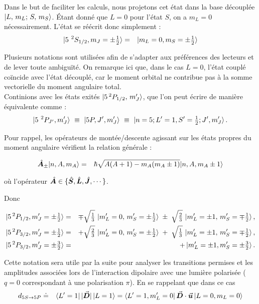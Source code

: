 Dans le but de faciliter les calculs, nous projetons cet état dans la base découplée $\ket{L,\,m_L;\,S,\,m_S}$. Étant donné que $L = 0$ pour l’état $S$, on a $m_L = 0$ nécessairement. L’état se réécrit donc simplement :
\begin{eqnarray*}
	\ket{ 5{~}^2S_{1/2} , m_J = \pm \tfrac12  } & = & \ket{  m_L = 0  , m_S= \pm \tfrac12  }  	
\end{eqnarray*}


Plusieurs notations sont utilisées afin de s’adapter aux préférences des lecteurs et de lever toute ambiguïté.
On remarque ici que, dans le cas $L = 0$, l’état couplé coïncide avec l’état découplé, car le moment orbital ne contribue pas à la somme vectorielle du moment angulaire total.\\

Continions avec les états exités $\ket{5\,^2P_{1/2},\,m_J'}$, que l’on peut écrire de manière équivalente comme :
\begin{eqnarray*}
	\ket{ 5{~}^2P_{J'} , m_J'  } ~\equiv~ \ket{ 5P , J'  , m_J' }  ~\equiv~ \ket{n=5 ; L'=1 , S'=\tfrac12 ;  J'  , m_J'  }.
\end{eqnarray*}

Pour rappel, les opérateurs de montée/descente agissant sur les états propres du moment angulaire vérifient la relation générale :


\begin{eqnarray}
	\hat{\bm{A}}_\pm \vert n , A , m	_A \rangle & = & \hbar \sqrt{A(A+1) - m_A(m_A\pm 1 ) } \vert n , A , m	_A \pm 1  \rangle
\end{eqnarray}

où l'opérateur $\hat{\bm{A}} \in \{ \hat{\bm{S}} , \hat{\bm{L}} , \hat{\bm{J}} , \cdots \}$.

Donc 

\begin{eqnarray*} 
	\ket{5\,^2P_{1/2},m_J' = \pm\tfrac12} &=& \mp\sqrt{\tfrac{1}{3}}\,\ket{ m_L'=0,\,m_S'=\pm\tfrac12} \;\pm\;\sqrt{\tfrac{2}{3}}\,\ket{m_L'=\pm 1,\,m_S'=\mp\tfrac12},\\ 
	\ket{5\,^2P_{3/2},m_J' = \pm\tfrac12} &=& +\sqrt{\tfrac{2}{3}}\,\ket{m_L'=0,\,m_S'=\pm\tfrac12} \;+\;\sqrt{\tfrac{1}{3}}\,\ket{ m_L'=\pm 1,\,m_S'=\mp\tfrac12},\\
	\ket{5\,^2P_{3/2},m_J' = \pm\tfrac32} &= & +\ket{m_L'=\pm 1 , m_S' = \pm \tfrac32}.  
\end{eqnarray*}
 
Cette notation sera utile par la suite pour analyser les transitions permises et les amplitudes associées lors de l’interaction dipolaire avec une lumière polarisée ($q = 0$ correspondant à une polarisation $\pi$). En se rappelant que dans ce cas 
\begin{eqnarray*}
	d_{\scriptstyle 5S \rightarrow 5P} & \doteq &\bra{L'=1} \vert \vec{{\bm{D}}} \vert \ket{L=1} = \bra{L'=1 , m_L' =0 }  \vec{{\bm{D}}} \cdot \vec{{\bm{u}}} \ket{L=0 , m_L = 0 }	
\end{eqnarray*}

